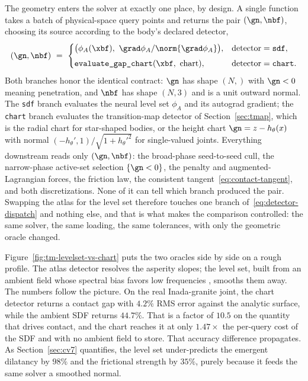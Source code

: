 The geometry enters the solver at exactly one place, by design. A single function
 takes a batch of physical-space query points and returns the pair
$(\gn,\nbf)$, choosing its source according to the body's declared detector,
\begin{equation}\label{eq:detector-dispatch}
(\gn,\nbf)\ =\
\begin{cases}
\big(\phi_A(\xbf),\ \grad\phi_A/\norm{\grad\phi_A}\big), & \text{detector} = \texttt{sdf},\\[4pt]
\texttt{evaluate\_gap\_chart}(\xbf,\ \text{chart}), & \text{detector} = \texttt{chart}.
\end{cases}
\end{equation}
Both branches honor the identical contract: $\gn$ has shape $(N,)$ with $\gn<0$ meaning penetration,
and $\nbf$ has shape $(N,3)$ and is a unit outward normal. The \texttt{sdf} branch evaluates the
neural level set $\phi_A$ and its autograd gradient; the \texttt{chart} branch evaluates the
transition-map detector of Section~\ref{sec:tmap}, which is the radial chart for star-shaped bodies, or
the height chart $\gn=z-h_\theta(x)$ with normal $(-h_\theta',1)/\sqrt{1+h_\theta'^2}$ for
single-valued joints. Everything downstream reads only $(\gn,\nbf)$: the broad-phase seed-to-seed cull,
the narrow-phase active-set selection $\{\gn<0\}$, the penalty and augmented-Lagrangian forces, the
friction law, the consistent tangent~\eqref{eq:contact-tangent}, and both discretizations. None of it
can tell which branch produced the pair. Swapping the atlas for the level set therefore touches one
branch of~\eqref{eq:detector-dispatch} and nothing else, and that is what makes the comparison
controlled: the same solver, the same loading, the same tolerances, with only the geometric oracle
changed.

Figure~\ref{fig:tm-levelset-vs-chart} puts the two oracles side by side on a rough profile. The atlas
detector resolves the asperity slopes; the level set, built from an ambient field whose spectral bias
favors low frequencies \citep{rahaman2019spectral}, smooths them away. The numbers follow the
picture. On the real Inada-granite joint, the chart detector returns a contact gap with $4.2\%$ RMS
error against the analytic surface, while the ambient SDF returns $44.7\%$. That is a factor of $10.5$
on the quantity that drives contact, and the chart reaches it at only $1.47\times$ the per-query cost
of the SDF and with no ambient field to store. That accuracy difference propagates. As
Section~\ref{sec:cv7} quantifies, the level set under-predicts the emergent dilatancy by $98\%$ and the
frictional strength by $35\%$, purely because it feeds the same solver a smoothed normal.

